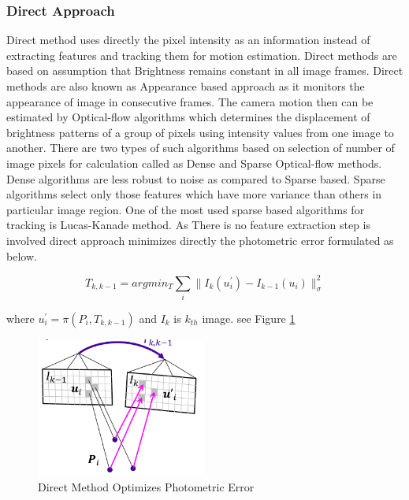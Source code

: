 \subsubsection{Direct Approach}

Direct method uses directly the pixel intensity as an information instead of extracting features and tracking them for motion estimation. Direct methods are based on assumption that Brightness remains constant in all image frames.\cite{Irani-et-al-1999} Direct methods are also known as Appearance based approach as it monitors the appearance of image in consecutive frames. The camera motion then can be estimated by Optical-flow algorithms which determines the displacement of brightness patterns of a group of pixels using intensity values from one image to another.\cite{Aqel-et-al-2016} There are two types of such algorithms based on selection of number of image pixels for calculation called as Dense and Sparse Optical-flow methods. Dense algorithms are less robust to noise as compared to Sparse based. Sparse algorithms select only those features which have more variance than others in particular image region. One of the most used sparse based algorithms for tracking is Lucas-Kanade method.\cite{Lucas81} As There is no feature extraction step is involved direct approach minimizes directly the photometric error formulated as below. 

\begin{equation*}
	T_{k,k-1} = arg min_{T} \sum_{i} \| I_{k}(u^{'}_{i})- I_{k-1}(u_{i})\|^{2}_{\sigma}
\end{equation*}

where   $u^{'}_{i} = \pi (P_{i},T_{k,k-1})$ and $I_{k} $ is  $k_{th}$ image. see Figure \ref{fig:direct}

\begin{figure}[h]
	\centering
	\includegraphics[width=0.5\textwidth]{direct}
	\caption{Direct Method Optimizes Photometric Error}
	\label{fig:direct}
\end{figure}

